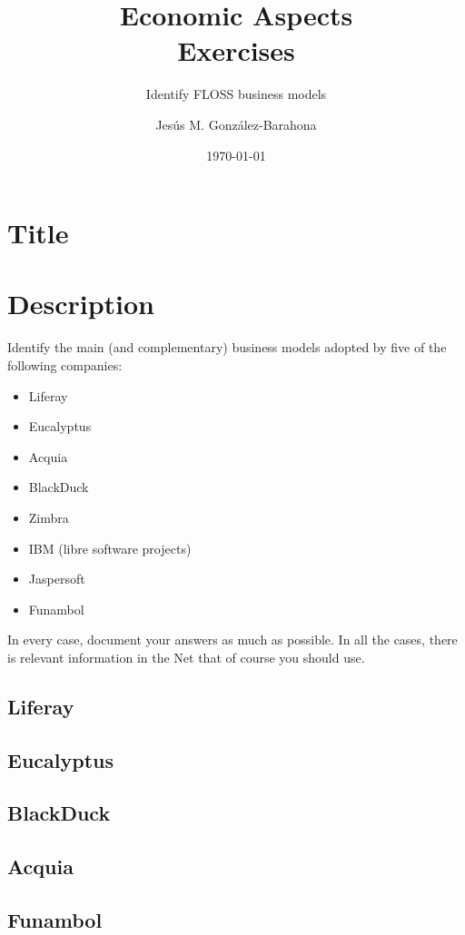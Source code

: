 \documentclass[11pt]{scrartcl}
\title{\textbf{Economic Aspects\\
                Exercises}}
\subtitle{Identify FLOSS business models}
\author{Jesús M. González-Barahona}
\date{\today}
\begin{document}
\maketitle

\section{Title}

\section{Description}

Identify the main (and complementary) business models adopted by five of the following companies:

\begin{itemize}
  \item Liferay
  \item Eucalyptus
  \item Acquia
  \item BlackDuck
  \item Zimbra
  \item IBM (libre software projects)
  \item Jaspersoft
  \item Funambol
\end{itemize}

In every case, document your answers as much as possible. In all the cases, there is relevant information in the Net that of course you should use.

\subsection{Liferay}

\subsection{Eucalyptus}

\subsection{BlackDuck}

\subsection{Acquia}

\subsection{Funambol}
\end{document}
